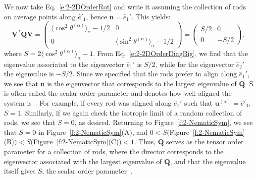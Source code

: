 We now take Eq.~\ref{e:2-2DOrderRot} and write it assuming the collection of rods on average points along $\hat{e}'_1$, hence $\mathbf{n} = \hat{e}_1'$.
This yields:
\begin{equation}
  \mathbf{V}^T \mathbf{Q} \mathbf{V} =
  \begin{pmatrix}
    \langle \cos^2 \theta^{(\alpha)}\rangle_{\alpha} - 1/2 & 0 \\
    0 & \langle \sin^2 \theta^{(\alpha)} \rangle_{\alpha} - 1/2
  \end{pmatrix} =
  \begin{pmatrix}
    S/2 & 0 \\
    0 & -S/2
  \end{pmatrix},\label{e:2-2DOrderDiagBig}
\end{equation}
where $S = 2 \langle \cos^2 \theta^{(\alpha)} \rangle_{\alpha} - 1$.
From Eq.~\ref{e:2-2DOrderDiagBig}, we find that the eigenvalue associated to the eigenvector $\hat{e}_1'$ is $S/2$, while for the eigenvector $\hat{e}_2'$ the eigenvalue is $-S/2$.
Since we specified that the rods prefer to align along $\hat{e}_1'$, we see that $\mathbf{n}$ is the eigenvector that corresponds to the largest eigenvalue of $\mathbf{Q}$.
S is often called the scalar order parameter and denotes how well-aligned the system is~\cite{RN33}.
For example, if every rod was aligned along $\hat{e}_1'$ such that $\mathbf{u}^{(\alpha)} = \hat{e}'_1$, $S = 1$.
Similarly, if we again check the isotropic limit of a random collection of rods, we see that $S = 0$, as desired.
Returning to Figure~\ref{f:2-NematicSym}, we see that $S=0$ in Figure~\ref{f:2-NematicSym}(A), and $0 < S\big($Figure~\ref{f:2-NematicSym}(B)$\big) < S\big($Figure~\ref{f:2-NematicSym}(C)$\big) < 1$.
Thus, $\mathbf{Q}$ serves as the tensor order parameter for a collection of rods, where the director corresponds to the eigenvector associated with the largest eigenvalue of $\mathbf{Q}$, and that the eigenvalue itself gives $S$, the scalar order parameter~\cite{RN33,RN175}.

